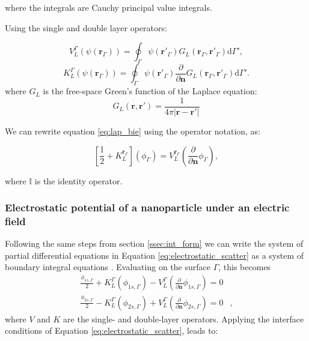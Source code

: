 where the integrals are Cauchy principal value integrals.

Using the single and double layer operators:

\begin{equation}\label{eq:single_layer}
   V^{\Gamma}_L (\psi(\mathbf{r}_\Gamma)) = \oint_\Gamma \psi(\mathbf{r}'_\Gamma) G_L(\mathbf{r}_\Gamma, \mathbf{r}'_\Gamma) \text{d} \Gamma',
   \end{equation}
   \begin{equation}\label{eq:double_layer}
   K^{\Gamma}_L (\psi(\mathbf{r}_\Gamma)) = \oint_\Gamma \psi(\mathbf{r}'_\Gamma) \frac{\partial}{\partial \mathbf{n}}G_L(\mathbf{r}_\Gamma, \mathbf{r}'_\Gamma) \text{d} \Gamma'.
   \end{equation}
where $G_L$ is the free-space Green's function of the Laplace equation:
   \begin{equation}
   G_L(\mathbf{r},\mathbf{r}') = \frac{1}{4\pi|\mathbf{r}-\mathbf{r}'|}
   \end{equation}
   

We can rewrite equation \eqref{eq:lap_bie} using the operator notation, as:

\begin{equation} \label{eq:lap_operator}
\left[ \frac{\mathbb{I}}{2} + K_L^{\mathbf{r}_\Gamma} \right] \left( \phi_\Gamma \right) = V_L^{\mathbf{r}_\Gamma} \left( \frac{\partial}{\partial \mathbf{n}} \phi_\Gamma \right),
\end{equation}

where $\mathbb{I}$ is the identity operator.

\subsubsection{Electrostatic potential of a nanoparticle under an electric field} \label{sec:pot_elec_field}

Following the same steps from section \ref{ssec:int_form}  we can write the system of partial differential equations 
in Equation \eqref{eq:electrostatic_scatter} as a system of boundary integral equations \cite{BrebbiaDominguez1992}. Evaluating on the
surface $\Gamma$, this becomes
%
\begin{align} \label{eq:integral_eq_lspr_nobc}
\frac{\phi_{1s,\Gamma}}{2}+ K_{L}^{\Gamma}(\phi_{1s,\Gamma}) - V_{L}^{\Gamma} \left(\frac{\partial}{\partial \mathbf{n}}\phi_{1s,\Gamma} \right) = 0&  \nonumber \\
\frac{\phi_{2s,\Gamma}}{2} - K_{L}^{\Gamma}(\phi_{2s,\Gamma}) + V_{L}^{\Gamma} \left( \frac{\partial}{\partial \mathbf{n}} \phi_{2s,\Gamma} \right) = 0&,
\end{align}
%
where $V$ and $K$ are the single- and double-layer operators.
%
Applying the interface conditions of Equation \eqref{eq:electrostatic_scatter},
leads to:

